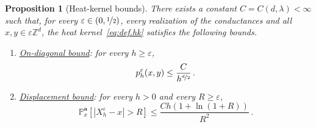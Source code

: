 \documentclass[11pt]{amsart}
\newtheorem{proposition}[theorem]{Proposition}
\numberwithin{equation}{section}
\newcommand{\Z}{\mathbb{Z}}
\newcommand{\PP}{\mathbb{P}}
\newcommand{\ba}{\mathbf{a}}
\newcommand{\eps}{\varepsilon}
\newcommand{\nf}{\nicefrac}
\begin{document}
\begin{proposition}[Heat-kernel bounds] \label{prop:hk}
There exists a constant $C = C(d, \lambda) < \infty$ such that, for every $\eps \in (0, \nf12)$, every realization of the conductances and all $x, y \in \eps \Z^d$, the heat kernel~\eqref{eq:def.hk} satisfies the following bounds.
\begin{enumerate}
    \item[\textup{(i)}] \underline{\emph{On-diagonal bound}}: for every $h \geq \eps$,
    \begin{equation} \label{eq:hk.diag}
        p^\eps_h(x, y) \leq \frac{C}{h^{\nf{d}{2}}}\,.
    \end{equation}
    \item[\textup{(ii)}] \underline{\emph{Displacement bound}}: for every $h > 0$ and every $R \geq \eps$,
    \begin{equation} \label{eq:hk.displacement}
        \PP^\ba_x \left[ |X^\eps_h - x| > R \right] \leq \frac{C h \left( 1 + \ln (1 + R) \right)}{R^2}\,.
    \end{equation}
\end{enumerate}
\end{proposition}
\end{document}

